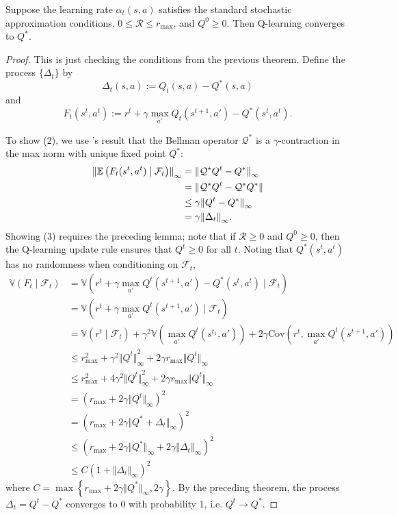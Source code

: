 \documentclass[twoside,10pt]{report}
\begin{document}
\begin{prop}
	Suppose the learning rate $\alpha_{t}(s,a)$ satisfies the standard stochastic approximation conditions, $0 \leq \mathcal{R} \leq r_{\text{max}}$, and $Q^{0} \geq 0$. Then Q-learning converges to $Q^{*}$.
\end{prop}
\begin{proof}
	This is just checking the conditions from the previous theorem. Define the process $\{\Delta_{t}\}$ by
	\[
	\Delta_{t}(s,a) := Q_{t}(s,a) - Q^{*}(s,a)
	\] and
	\[
	F_{t}(s^{t},a^{t}) := r^{t} + \gamma \max_{a'} Q_{t}(s^{t+1},a') - Q^{*}(s^{t},a^{t}).
	\] 

	To show (2), we use 's result that the Bellman operator $\mathcal{Q}^{*}$ is a $\gamma$-contraction in the max norm with unique fixed point $Q^{*}$:
	\begin{align*}
		{\Vert{\mathbb{E} \left(  F_{t}(s^{t},a^{t}) \;|\; \mathcal{F}_{t} \right)}\Vert}_{\infty} &= {\Vert{\mathcal{Q}^{*} Q^{t} - Q^{*}}\Vert}_{\infty} \\
										     &= {\Vert{\mathcal{Q}^{*} Q^{t} - \mathcal{Q}^{*} Q^{*}}\Vert} \\
										     &\leq \gamma {\Vert{Q^{t} - Q^{*}}\Vert}_{\infty} \\
										     &= \gamma {\Vert{\Delta_{t}}\Vert}_{\infty}.
	\end{align*}
	Showing (3) requires the preceding lemma; note that if $\mathcal{R} \geq 0$ and $Q^{0} \geq 0$, then the Q-learning update rule ensures that $Q^{t} \geq 0$ for all $t$. Noting that $Q^{*}(s^{t},a^{t})$ has no randomness when conditioning on $\mathcal{F}_{t}$,
	\begin{align*}
		\mathbb{V}(F_{t} \;|\; \mathcal{F}_{t}) &= \mathbb{V}(r^{t} + \gamma \max_{a'} Q^{t}(s^{t+1},a') - Q^{*}(s^{t},a^{t}) \;|\; \mathcal{F}_{t}) \\
		&= \mathbb{V}(r^{t} + \gamma \max_{a'} Q^{t}(s^{t+1},a') \;|\; \mathcal{F}_{t}) \\
		&= \mathbb{V}(r^{t} \;|\; \mathcal{F}_{t}) + \gamma^{2}\mathbb{V}(\max_{a'}Q^{t}(s^{t_1},a')) + 2\gamma \text{Cov}( r^{t}, \max_{a'}Q^{t}(s^{t+1},a')) \\
		&\leq r_{\text{max}}^2 + \gamma^{2} {\Vert{Q^{t}}\Vert}_\infty^2 + 2\gamma r_{\text{max}} {\Vert{Q^{t}}\Vert}_{\infty} \\
		&\leq r_{\text{max}}^2 + 4 \gamma^{2} {\Vert{Q^{t}}\Vert}_\infty^2 + 2\gamma r_{\text{max}} {\Vert{Q^{t}}\Vert}_{\infty} \\
		&= ( r_{\text{max}} + 2 \gamma {\Vert{Q^{t}}\Vert}_{\infty})^2 \\
		&= (r_{\text{max}} + 2 \gamma {\Vert{Q^{*} + \Delta_{t}}\Vert}_{\infty})^2 \\
		&\leq \left( r_{\text{max}} + 2\gamma {\Vert{Q^{*}}\Vert}_{\infty} + 2\gamma {\Vert{\Delta_{t}}\Vert}_{\infty} \right)^2 \\
		&\leq C (1 + {\Vert{\Delta_{t}}\Vert}_{\infty})^2
	\end{align*}
where $C = \max\left\{ r_{\text{max}} + 2 \gamma {\Vert{Q^{*}}\Vert}_{\infty}, 2 \gamma \right\}$. By the preceding theorem, the process $\Delta_{t} = Q^{t} - Q^{*}$ converges to 0 with probability 1, i.e. $Q^{t} \to Q^{*}$.
\end{proof}
\end{document}
